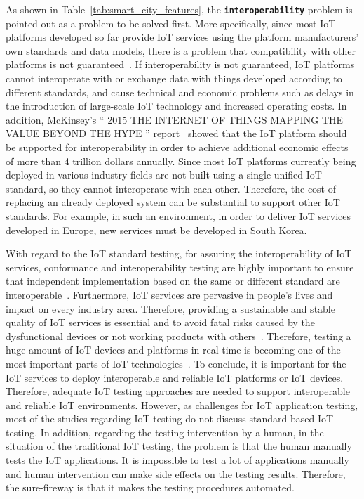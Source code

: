 As shown in Table~\ref{tab:smart_city_features}, the \textbf{\texttt{interoperability}} problem is pointed out as a problem to be solved first. More specifically, since most IoT platforms developed so far provide IoT services using the platform manufacturers' own standards and data models, there is a problem that compatibility with other platforms is not guaranteed~\cite{nist2017internet, aft2016interoperability}. If interoperability is not guaranteed, IoT platforms cannot interoperate with or exchange data with things developed according to different standards, and cause technical and economic problems such as delays in the introduction of large-scale IoT technology and increased operating costs. In addition, McKinsey's `` 2015 THE INTERNET OF THINGS MAPPING THE VALUE BEYOND THE HYPE '' report~\cite{manyika2015internet} showed that the IoT platform should be supported for interoperability in order to achieve additional economic effects of more than 4 trillion dollars annually. Since most IoT platforms currently being deployed in various industry fields are not built using a single unified IoT standard, so they cannot interoperate with each other. Therefore, the cost of replacing an already deployed system can be substantial to support other IoT standards. For example, in such an environment, in order to deliver IoT services developed in Europe, new services must be developed in South Korea.

With regard to the IoT standard testing, for assuring the interoperability of IoT services, conformance and interoperability testing are highly important to ensure that independent implementation based on the same or different standard are interoperable~\cite{kim2017towards}. Furthermore, IoT services are pervasive in people's lives and impact on every industry area. Therefore, providing a sustainable and stable quality of IoT services is essential and to avoid fatal risks caused by the dysfunctional devices or not working products with others~\cite{brady2017towards}. Therefore, testing a huge amount of IoT devices and platforms in real-time is becoming one of the most important parts of IoT technologies~\cite{ahmed2019aspects, sand2015iot}. To conclude, it is important for the IoT services to deploy interoperable and reliable IoT platforms or IoT devices. Therefore, adequate IoT testing approaches are needed to support interoperable and reliable IoT environments. However, as challenges for IoT application testing, most of the studies regarding IoT testing do not discuss standard-based IoT testing. In addition, regarding the testing intervention by a human, in the situation of the traditional IoT testing, the problem is that the human manually tests the IoT applications. It is impossible to test a lot of applications manually and human intervention can make side effects on the testing results. Therefore, the sure-fireway is that it makes the testing procedures automated.


